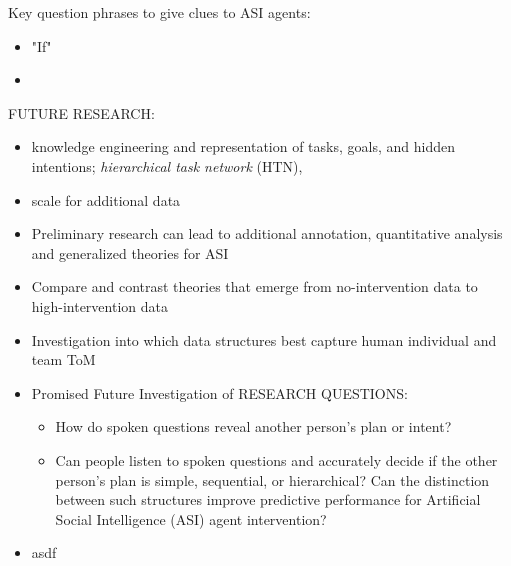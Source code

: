 \documentclass[10pt]{article}
\begin{document}
Key question phrases to give clues to ASI agents:
\begin{itemize}
    \item "If"
    \item
\end{itemize}



FUTURE RESEARCH:
\begin{itemize}
    \item knowledge engineering and representation of tasks, goals, and hidden intentions;  \emph{hierarchical task network} (HTN),
    \item scale for additional data
    \item Preliminary research can lead to additional annotation, quantitative analysis and generalized theories for ASI
    \item Compare and contrast theories that emerge from no-intervention data to high-intervention data
    \item Investigation into which data structures best capture human individual and team ToM
        \item Promised Future Investigation of RESEARCH QUESTIONS:
        \begin{itemize}
        \item How do spoken questions reveal another person’s plan or intent? 
    \item Can people listen to spoken questions and accurately decide if the other person's plan
        is simple, sequential, or hierarchical? Can the distinction between such
        structures improve predictive performance for Artificial Social
        Intelligence (ASI) agent intervention?
        \end{itemize}
        \item asdf
\end{itemize}





\newpage

\raggedright
\end{document}
